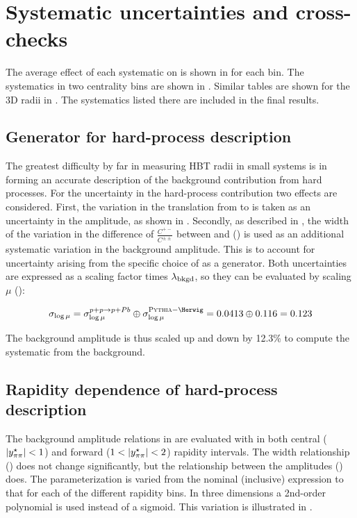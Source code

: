 \section{Systematic uncertainties and cross-checks}
\label{sec:systematics}

The average effect of each systematic on \Rinv is shown in  for each \kt bin.
The systematics in two centrality bins are shown in .
Similar tables are shown for the 3D radii in .
The systematics listed there are included in the final results.

\subsection{Generator for hard-process description}
The greatest difficulty by far in measuring HBT radii in small systems is in forming an accurate description of the background contribution from hard processes.
For the uncertainty in the hard-process contribution two effects are considered.
First, the variation in the translation from \pp to \pPb is taken as an uncertainty in the amplitude, as shown in .
Secondly, as described in , the width of the variation in the difference of $\frac{C^{+-}}{C^{\pm\pm}}$ between \Pythia and \Herwig () is used as an additional systematic variation in the background amplitude.
This is to account for uncertainty arising from the specific choice of \Pythia as a generator.
Both uncertainties are expressed as a scaling factor times $\lambda_{\mathrm{bkgd}}$, so they can be evaluated by scaling $\mu$ ():

\begin{equation}
\sigma_{\log \mu} = \sigma^{p+p \rightarrow p+Pb}_{\log \mu} \oplus \sigma^{\Pythia-\Herwig}_{\log \mu} = 0.0413 \oplus 0.116 = 0.123
\end{equation}

The background amplitude \lbkgd is thus scaled up and down by 12.3\% to compute the systematic from the background.

\subsection{Rapidity dependence of hard-process description}

The background amplitude relations in  are evaluated with \Pythia in both central ($|y^{\star}_{\pi\pi}| < 1$) and forward ($1 < |y^{\star}_{\pi\pi}| < 2$) rapidity intervals.
The width relationship () does not change significantly, but the relationship between the amplitudes () does.
The parameterization is varied from the nominal (inclusive) expression to that for each of the different rapidity bins.
In three dimensions a 2nd-order polynomial is used instead of a sigmoid.
This variation is illustrated in .

